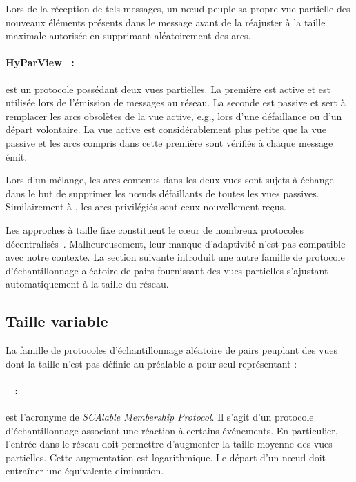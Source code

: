\noindent Lors de la réception de tels messages, un nœud peuple sa propre vue
partielle des nouveaux éléments présents dans le message avant de la réajuster à
la taille maximale autorisée en supprimant aléatoirement des arcs.

\paragraph{HyParView~\cite{leitao2007dependable} :} est un protocole possédant
deux vues partielles. La première est active et est utilisée lors de l'émission
de messages au réseau. La seconde est passive et sert à remplacer les arcs
obsolètes de la vue active, e.g., lors d'une défaillance ou d'un départ
volontaire.  La vue active est considérablement plus petite que la vue passive
et les arcs compris dans cette première sont vérifiés à chaque message émit.

\noindent Lors d'un mélange, les arcs contenus dans les deux vues sont sujets à
échange dans le but de supprimer les nœuds défaillants de toutes les vues
passives. Similairement à \CYCLON, les arcs privilégiés sont ceux nouvellement
reçus.


Les approches à taille fixe constituent le cœur de nombreux protocoles
décentralisés~\cite{dabek2004vivaldi, folz2016cyclades, jelasity2009tman,
  krasikova2016distributed}. Malheureusement, leur manque d'adaptivité n'est pas
compatible avec notre contexte.
La section suivante introduit une autre famille de protocole d'échantillonnage
aléatoire de pairs fournissant des vues partielles s'ajustant automatiquement à
la taille du réseau.

\subsection{Taille variable}
\label{net:subsec:variable}

La famille de protocoles d'échantillonnage aléatoire de pairs peuplant des vues
dont la taille n'est pas définie au préalable a pour seul représentant :

\paragraph{\SCAMP~\cite{ganesh2001scamp, ganesh2003peer} :} est l'acronyme de
\emph{SCAlable Membership Protocol}. Il s'agit d'un protocole d'échantillonnage
associant une réaction à certains événements. En particulier, l'entrée dans le
réseau doit permettre d'augmenter la taille moyenne des vues partielles. Cette
augmentation est logarithmique. Le départ d'un nœud doit entraîner une
équivalente diminution.

